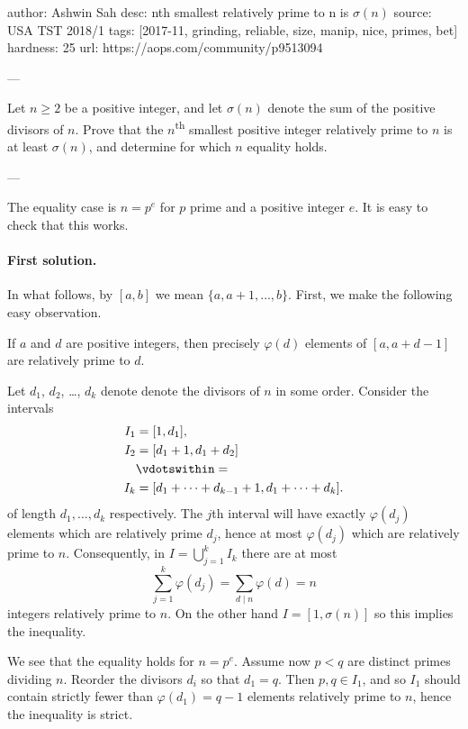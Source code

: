 author: Ashwin Sah
desc: nth smallest relatively prime to n is $\sigma(n)$
source: USA TST 2018/1
tags: [2017-11, grinding, reliable, size, manip, nice, primes, bet]
hardness: 25
url: https://aops.com/community/p9513094

---

Let $n \ge 2$ be a positive integer,
and let $\sigma(n)$ denote the sum of the positive divisors of $n$.
Prove that the $n$\textsuperscript{th} smallest positive integer
relatively prime to $n$ is at least $\sigma(n)$,
and determine for which $n$ equality holds.

---

The equality case is $n = p^e$ for
$p$ prime and a positive integer $e$.
It is easy to check that this works.

\bigskip

\paragraph{First solution.}
In what follows, by $[a,b]$ we mean $\{a,a+1,\dots,b\}$.
First, we make the following easy observation.
\begin{claim*}
  If $a$ and $d$ are positive integers,
  then precisely $\varphi(d)$ elements
  of $[a, a + d - 1]$ are relatively prime to $d$.
\end{claim*}

Let $d_1$, $d_2$, \dots, $d_k$ denote
denote the divisors of $n$ in some order.
Consider the intervals
\begin{align*}
  I_1 &= [1, d_1], \\
  I_2 &= [d_1+1, d_1+d_2] \\
  &\vdotswithin= \\
  I_k &= [d_1+\dots+d_{k-1}+1, d_1+\dots+d_k].
\end{align*}
of length $d_1, \dots, d_k$ respectively.
The $j$th interval will have exactly $\varphi(d_j)$ elements
which are relatively prime $d_j$,
hence at most $\varphi(d_j)$ which are relatively prime to $n$.
Consequently, in $I = \bigcup_{j=1}^k I_k$
there are at most
\[ \sum_{j=1}^k \varphi(d_j) = \sum_{d \mid n} \varphi(d) = n \]
integers relatively prime to $n$.
On the other hand $I = [1,\sigma(n)]$ so this implies the inequality.

We see that the equality holds for $n = p^e$.
Assume now $p < q$ are distinct primes dividing $n$.
Reorder the divisors $d_i$ so that $d_1 = q$.
Then $p,q \in I_1$, and so $I_1$ should contain
strictly fewer than $\varphi(d_1)=q-1$ elements
relatively prime to $n$, hence the inequality is strict.

